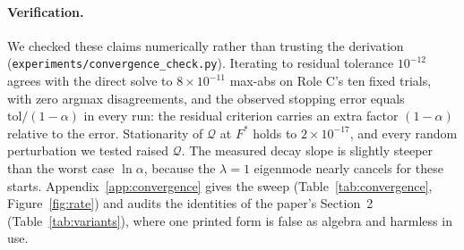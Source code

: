 \paragraph{Verification.}
We checked these claims numerically rather than trusting the derivation
(\texttt{experiments/convergence\_check.py}). Iterating to residual tolerance
$10^{-12}$ agrees with the direct solve to $8\times10^{-11}$ max-abs on Role C's ten
fixed trials, with zero argmax disagreements, and the observed stopping error equals
$\mathrm{tol}/(1-\alpha)$ in every run: the residual criterion carries an extra factor
$(1-\alpha)$ relative to the error. Stationarity of $\mathcal{Q}$ at $F^{*}$ holds to
$2\times10^{-17}$, and every random perturbation we tested raised $\mathcal{Q}$. The
measured decay slope is slightly steeper than the worst case $\ln\alpha$, because the
$\lambda=1$ eigenmode nearly cancels for these starts. Appendix~\ref{app:convergence}
gives the sweep (Table~\ref{tab:convergence}, Figure~\ref{fig:rate}) and audits the
identities of the paper's Section~2 (Table~\ref{tab:variants}), where one printed form
is false as algebra and harmless in use.
